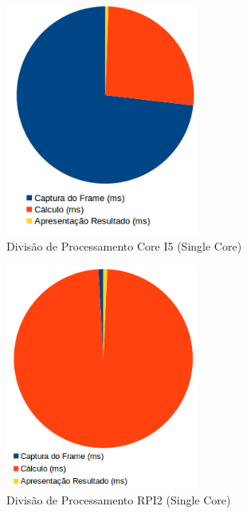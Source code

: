 \documentclass[conference]{IEEEtran}
\begin{document}
\begin{figure}[!t]
\centering
\includegraphics[width=2.5in]{Grafico_processamento_I5}
\caption{Divisão de Processamento Core I5 (Single Core)}
\label{fig:processamento_pc}
\end{figure}

\begin{figure}[!t]
\centering
\includegraphics[width=2.5in]{Grafico_processamento_rpi2_single_core}
\caption{Divisão de Processamento RPI2 (Single Core)}
\label{fig:processamento_rpi}
\end{figure}


\end{document}
